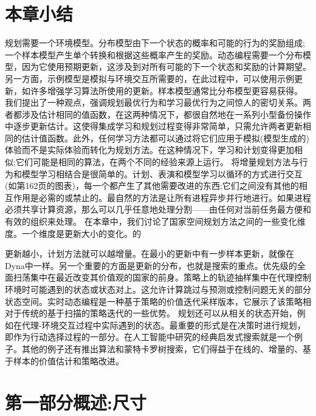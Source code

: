 \section{本章小结}

规划需要一个环境模型。分布模型由下一个状态的概率和可能的行为的奖励组成;一个样本模型产生单个转换和根据这些概率产生的奖励。动态编程需要一个分布模型，因为它使用预期更新，这涉及到对所有可能的下一个状态和奖励的计算期望。另一方面，示例模型是模拟与环境交互所需要的，在此过程中，可以使用示例更新，如许多增强学习算法所使用的更新。样本模型通常比分布模型更容易获得。
我们提出了一种观点，强调规划最优行为和学习最优行为之间惊人的密切关系。两者都涉及估计相同的值函数，在这两种情况下，都很自然地在一系列小型备份操作中逐步更新估计。这使得集成学习和规划过程变得非常简单，只需允许两者更新相同的估计值函数。此外，任何学习方法都可以通过将它们应用于模拟(模型生成的)体验而不是实际体验而转化为规划方法。在这种情况下，学习和计划变得更加相似;它们可能是相同的算法，在两个不同的经验来源上运行。
将增量规划方法与行为和模型学习相结合是很简单的。计划、表演和模型学习以循环的方式进行交互(如第162页的图表)，每一个都产生了其他需要改进的东西;它们之间没有其他的相互作用是必需的或禁止的。最自然的方法是让所有进程异步并行地进行。如果进程必须共享计算资源，那么可以几乎任意地处理分割——由任何对当前任务最方便和有效的组织来处理。
在本章中，我们讨论了国家空间规划方法之间的一些变化维度。一个维度是更新大小的变化。的


更新越小，计划方法就可以越增量。在最小的更新中有一步样本更新，就像在Dyna中一样。另一个重要的方面是更新的分布，也就是搜索的重点。优先级的全面扫荡集中在最近改变其价值观的国家的前身。策略上的轨迹抽样集中在代理控制环境时可能遇到的状态或状态对上。这允许计算跳过与预测或控制问题无关的部分状态空间。实时动态编程是一种基于策略的价值迭代采样版本，它展示了该策略相对于传统的基于扫描的策略迭代的一些优势。
规划还可以从相关的状态开始，例如在代理-环境交互过程中实际遇到的状态。最重要的形式是在决策时进行规划，即作为行动选择过程的一部分。在人工智能中研究的经典启发式搜索就是一个例子。其他的例子还有推出算法和蒙特卡罗树搜索，它们得益于在线的、增量的、基于样本的价值估计和策略改进。


\section{第一部分概述:尺寸}

